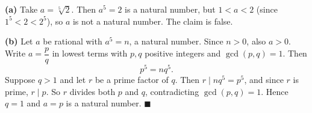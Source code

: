 \textbf{(a)} Take $a=\sqrt[5]{2}$. Then $a^5=2$ is a natural number, but $1<a<2$ (since $1^5<2<2^5$), so $a$ is not a natural number. The claim is false.

\textbf{(b)} Let $a$ be rational with $a^5=n$, a natural number. Since $n>0$, also $a>0$. Write $a=\dfrac {p}{q}$ in lowest terms with $p,q$ positive integers and $\gcd(p,q)=1$. Then
\[
p^5=nq^5 .
\]
Suppose $q>1$ and let $r$ be a prime factor of $q$. Then $r\mid nq^5=p^5$, and since $r$ is prime, $r\mid p$. So $r$ divides both $p$ and $q$, contradicting $\gcd(p,q)=1$. Hence $q=1$ and $a=p$ is a natural number. $\blacksquare$
